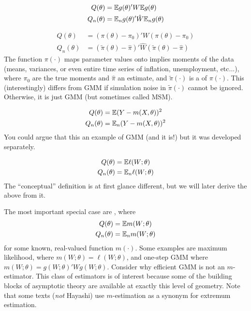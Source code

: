 \documentclass[10pt]{article}
\begin{document}
\begin{example}
	\begin{align*}
		Q(\theta) &= \mathbb{E} g(\theta)' W \mathbb{E} g(\theta) \\
		Q_n(\theta) &= \mathbb{E}_n g(\theta)' \hat{W} \mathbb{E}_n g(\theta)
	\end{align*}
\end{example}
\begin{example}
	\begin{align*}
		Q(\theta) &= (\pi(\theta) - \pi_0)' W (\pi(\theta) - \pi_0) \\
		Q_n(\theta) &= (\tilde{\pi}(\theta) - \hat{\pi})' \hat{W} (\tilde{\pi}(\theta) - \hat{\pi})
	\end{align*}
	The function $\pi(\cdot)$ maps parameter values onto implies moments of the data (\eg means, variances, or even entire time series of inflation, unemployment, etc...), where $\pi_0$ are the true moments and $\hat{\pi}$ an estimate, and $\tilde{\pi}(\cdot)$ is a  of $\pi(\cdot)$. This (interestingly) differs from GMM if simulation noise in $\tilde{\pi}(\cdot)$ cannot be ignored. Otherwise, it is just GMM (but sometimes called MSM).
\end{example}

\begin{example}
	\begin{align*}
		Q(\theta) &= \mathbb{E} (Y - m(X,\theta))^2 \\
		Q_n(\theta) &= \mathbb{E}_n (Y - m(X,\theta))^2 
	\end{align*}
	You could argue that this an example of GMM (and it is!) but it was developed separately.
\end{example}
\begin{example}
	\begin{align*}
		Q(\theta) &= \mathbb{E} \ell(W;\theta) \\
		Q_n(\theta) &= \mathbb{E}_n \ell(W;\theta)
	\end{align*}
	The ``conceptual'' definition is at first glance different, but we will later derive the above from it.
\end{example}

\begin{definition}
	The most important special case are , where \begin{align*}
		Q(\theta) &= \mathbb{E} m(W;\theta) \\ Q_n(\theta) &= \mathbb{E}_n m(W;\theta)
	\end{align*}
	for some known, real-valued function $m(\cdot)$. Some examples are maximum likelihood, where $m(W;\theta) = \ell(W;\theta)$, and one-step GMM where $m(W;\theta) = g(W;\theta)' W g(W;\theta)$. Consider why efficient GMM is not an $m$-estimator. This class of estimators is of interest because some of the building blocks of asymptotic theory are available at exactly this level of geometry. Note that some texts (\emph{not} Hayashi) use $m$-estimation as a synonym for extremum estimation.
\end{definition}
\end{document}
